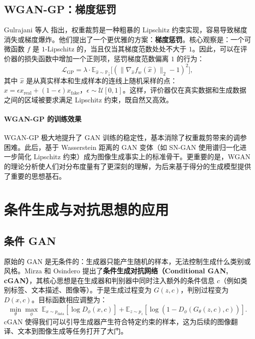 \subsection{WGAN-GP：梯度惩罚}

Gulrajani 等人\cite{gulrajani2017improvedtrainingwassersteingans} 指出，权重裁剪是一种粗暴的 Lipschitz 约束实现，容易导致梯度消失或梯度爆炸。他们提出了一个更优雅的方案：\textbf{梯度惩罚}。核心观察是：一个可微函数 $f$ 是 $1$-Lipschitz 的，当且仅当其梯度范数处处不大于 $1$。因此，可以在评价器的损失函数中增加一个正则项，惩罚梯度范数偏离 $1$ 的行为：
\begin{equation}\label{eq:wgan_gp}
\mathcal{L}_{\text{GP}} = \lambda \cdot \mathbb{E}_{\hat{x} \sim \mathbb{P}_{\hat{x}}} \big[(\|\nabla_{\hat{x}} f_w(\hat{x})\|_2 - 1)^2\big],
\end{equation}
其中 $\hat{x}$ 是从真实样本和生成样本的连线上随机采样的点：$\hat{x} = \epsilon x_{\text{real}} + (1-\epsilon) x_{\text{fake}}$，$\epsilon \sim \mathcal{U}[0,1]$。这样，评价器仅在真实数据和生成数据之间的区域被要求满足 Lipschitz 约束，既自然又高效。

\paragraph{WGAN-GP 的训练效果}

WGAN-GP 极大地提升了 GAN 训练的稳定性，基本消除了权重裁剪带来的调参困难。此后，基于 Wasserstein 距离的 GAN 变体（如 SN-GAN\cite{miyato2018spectralnormalizationgenerativeadversarial} 使用谱归一化进一步简化 Lipschitz 约束）成为图像生成事实上的标准骨干。更重要的是，WGAN 的理论分析使人们对分布度量有了更深刻的理解，为后来基于得分的生成模型提供了重要的思想基石。

\section{条件生成与对抗思想的应用}

\subsection{条件 GAN}

原始的 GAN 是无条件的：生成器只能产生随机的样本，无法控制生成什么类别或风格。Mirza 和 Osindero\cite{mirza2014conditionalgenerativeadversarialnets} 提出了\textbf{条件生成对抗网络（Conditional GAN, cGAN）}，其核心思想是在生成器和判别器中同时注入额外的条件信息 $c$（例如类别标签、文本描述、图像等）。于是生成过程变为 $G(z, c)$，判别过程变为 $D(x, c)$。目标函数相应调整为：
\begin{equation}
\min_{\theta} \max_{\phi} \; \mathbb{E}_{x \sim p_{\text{data}}}[\log D_{\phi}(x, c)] + \mathbb{E}_{z \sim p_z}[\log(1 - D_{\phi}(G_{\theta}(z, c), c))].
\end{equation}
cGAN 使得我们可以引导生成器产生符合特定约束的样本，这为后续的图像翻译、文本到图像生成等任务打开了大门。

